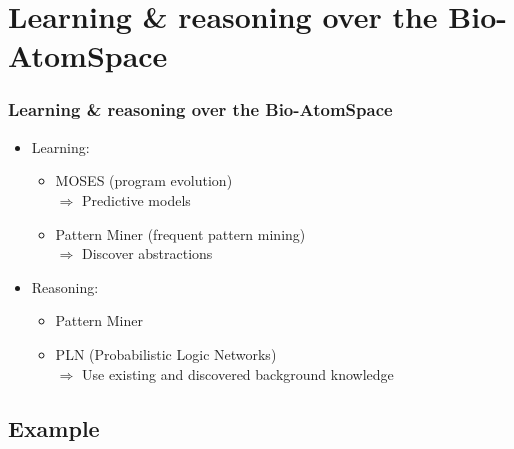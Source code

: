 \documentclass[aspectratio=169]{beamer}
\begin{document}
\section{Learning \& reasoning over the Bio-AtomSpace}

\begin{frame}
  \frametitle{Learning \& reasoning over the Bio-AtomSpace}

  \begin{itemize}
  \item Learning:\\
    \begin{itemize}
    \item MOSES (program evolution)\\
      $\Rightarrow$ \alert{Predictive models}
    \item Pattern Miner (frequent pattern mining)\\
      $\Rightarrow$ \alert{Discover abstractions}
    \end{itemize}
  \item Reasoning:\\
    \begin{itemize}
    \item Pattern Miner
    \item PLN (Probabilistic Logic Networks)\\
      $\Rightarrow$ \alert{Use existing and discovered background knowledge}
    \end{itemize}
  \end{itemize}
  
\end{frame}

\subsection{Example}
\end{document}
